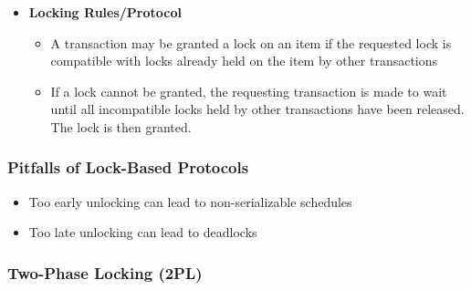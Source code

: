 \begin{itemize}[label=\(\rhd\)]
    \item \textbf{Locking Rules/Protocol} 
    \begin{itemize}[label=\(\rhd\)]
        \item A transaction may be granted a lock on an item if the requested lock is compatible with locks already held on the item by other transactions
        \item If a lock cannot be granted, the requesting transaction is made to wait until all incompatible locks held by other transactions have been released. The lock is then granted.
    \end{itemize}
\end{itemize}

\subsubsection{Pitfalls of Lock-Based Protocols}

\begin{itemize}[label=\(\rhd\)]
    \item Too early unlocking can lead to non-serializable schedules
    \item Too late unlocking can lead to deadlocks
\end{itemize}

\subsubsection{Two-Phase Locking (2PL)}

